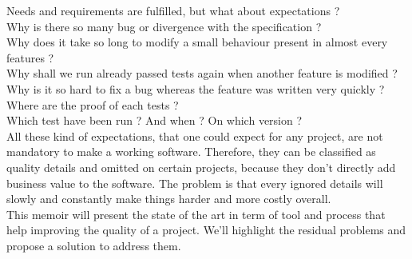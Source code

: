 Needs and requirements are fulfilled, but what about expectations ? \\
Why is there so many bug or divergence with the specification ? \\
Why does it take so long to modify a small behaviour present in almost every
features ? \\
Why shall we run already passed tests again when another feature is modified
? \\
Why is it so hard to fix a bug whereas the feature was written very quickly ? \\
Where are the proof of each tests ? \\
Which test have been run ?
And when ?
On which version ? \\
\newline
All these kind of expectations, that one could expect for any project, are
not mandatory to make a working software.
Therefore, they can be classified as quality details and omitted on certain
projects, because they don't directly add business value to the software.
The problem is that every ignored details will slowly and constantly make
things harder and more costly overall. \\
\newline
This memoir will present the state of the art in term of tool
and process that help improving the quality of a project.
We'll highlight the residual problems and propose a solution to address them.

